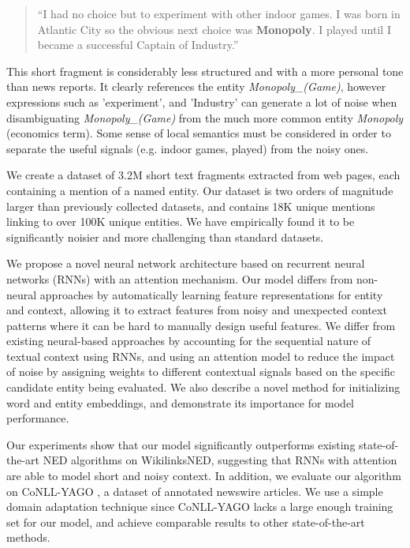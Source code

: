 \documentclass[11pt]{article}
\begin{document}
	\begin{quote}
		``I had no choice but to experiment with other indoor games. I was born in Atlantic City so the obvious next choice was \textbf{Monopoly}. I played until I became a successful Captain of Industry.''
	\end{quote}
	
	This short fragment is considerably less structured and with a more personal tone than news reports. It clearly references the entity \textit{Monopoly\_(Game)}, however expressions such as 'experiment', and 'Industry' can generate a lot of noise when disambiguating \textit{Monopoly\_(Game)} from the much more common entity \textit{Monopoly} (economics term). Some sense of local semantics must be considered in order to separate the useful signals (e.g. indoor games, played) from the noisy ones.
	
	We create a dataset of 3.2M short text fragments extracted from web pages, each containing a mention of a named entity. Our dataset is two orders of magnitude larger than previously collected datasets, and contains 18K unique mentions linking to over 100K unique entities. We have empirically found it to be significantly noisier and more challenging than standard datasets.
	
	We propose a novel neural network architecture based on recurrent neural networks (RNNs) with an attention mechanism. Our model differs from non-neural approaches by automatically learning feature representations for entity and context, allowing it to extract features from noisy and unexpected context patterns where it can be hard to manually design useful features. We differ from existing neural-based approaches by accounting for the sequential nature of textual context using RNNs, and using an attention model to reduce the impact of noise by assigning weights to different contextual signals based on the specific candidate entity being evaluated. We also describe a novel method for initializing word and entity embeddings, and demonstrate its importance for model performance. 
	
	Our experiments show that our model significantly outperforms existing state-of-the-art NED algorithms on WikilinksNED, suggesting that RNNs with attention are able to model short and noisy context. In addition, we evaluate our algorithm on CoNLL-YAGO \cite{hoffart2011robust}, a dataset of annotated newswire articles. We use a simple domain adaptation technique since CoNLL-YAGO lacks a large enough training set for our model, and achieve comparable results to other state-of-the-art methods. 
	
\end{document}
